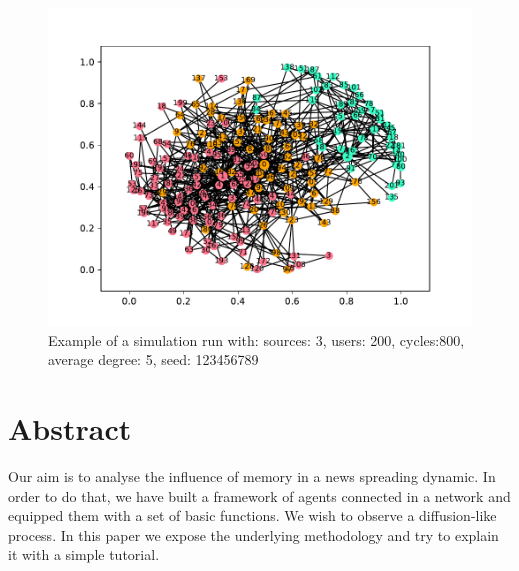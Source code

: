 \begin{figure}[!h]
  \centering
  \includegraphics[trim={2.1cm 2cm 2cm 2cm}, clip, width=\columnwidth]{img/pdf/cover}
  \caption{Example of a simulation run with: sources: 3, users: 200, cycles:800, average degree: 5, seed: 123456789}
  \label{fig:abstract}
\end{figure}

\section*{Abstract}\label{abstract}
Our aim is to analyse the influence of memory in a news spreading dynamic. In order to do that, we have built a framework of agents 
connected in a network and equipped them with a set of basic functions. We wish to observe a diffusion-like process.
In this paper we expose the underlying methodology and try to explain it with a simple tutorial.

